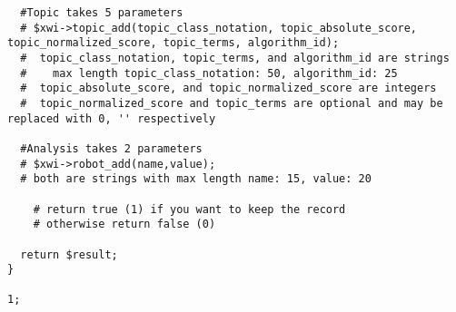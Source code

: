 \begin{verbatim}
  #Topic takes 5 parameters
  # $xwi->topic_add(topic_class_notation, topic_absolute_score, topic_normalized_score, topic_terms, algorithm_id);
  #  topic_class_notation, topic_terms, and algorithm_id are strings
  #    max length topic_class_notation: 50, algorithm_id: 25
  #  topic_absolute_score, and topic_normalized_score are integers
  #  topic_normalized_score and topic_terms are optional and may be replaced with 0, '' respectively

  #Analysis takes 2 parameters
  # $xwi->robot_add(name,value);
  # both are strings with max length name: 15, value: 20

    # return true (1) if you want to keep the record
    # otherwise return false (0)

  return $result;
}

1;
\end{verbatim}
